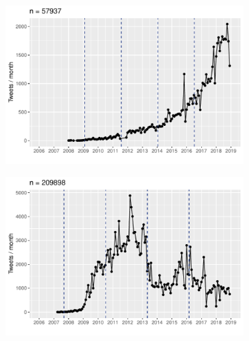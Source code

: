 \documentclass[
  a4paper,
  abstract=on,
  captions=tableabove
  ]{scrartcl}
\begin{document}
      \begin{figure}
        \centering
        \begin{subfigure}{.3\linewidth}
          \caption{}
          \label{subfig:freq_temp_upskill}
          \includegraphics[width=\linewidth, height=.8\textheight, keepaspectratio]{"img/ui_upskill_time.pdf"}
        \end{subfigure}
        \begin{subfigure}{.3\linewidth}
          \caption{}
          \label{subfig:freq_temp_hyperlocal}
          \includegraphics[width=\linewidth, height=.8\textheight, keepaspectratio]{"img/ui_hyperlocal_time.pdf"}
        \end{subfigure}
        \begin{subfigure}{.3\linewidth}
          \caption{}
          \label{subfig:freq_temp_solopreneur}

\end{subfigure}
\end{figure}
\end{document}
